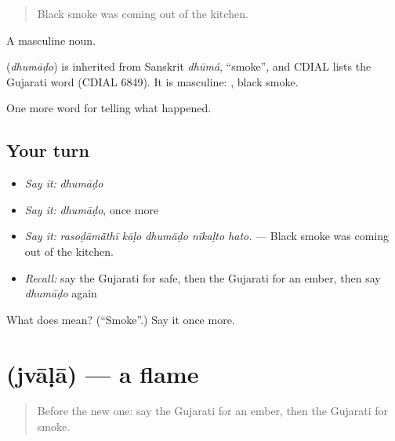 \begin{quote}
Black smoke was coming out of the kitchen.
\end{quote}

A masculine noun.

\begin{cousinweb}
\textbf{} (\emph{dhumāḍo}) is inherited from Sanskrit \emph{dhūmá}, \textquotedblleft{}smoke\textquotedblright{}, and CDIAL lists the Gujarati word (CDIAL 6849). It is masculine: \textbf{ }, black smoke.
\end{cousinweb}

\begin{grammarlens}[title={What you've built}]
One more word for telling what happened.
\end{grammarlens}

\subsection*{Your turn}
\begin{itemize}
\raggedright
  \item \emph{Say it:} \emph{dhumāḍo}
  \item \emph{Say it:} \emph{dhumāḍo}, once more
  \item \emph{Say it:} \emph{rasoḍāmā̃thī kāḷo dhumāḍo nīkaḷto hato.} — Black smoke was coming out of the kitchen.
  \item \emph{Recall:} say the Gujarati for safe, then the Gujarati for an ember, then say \emph{dhumāḍo} again
\end{itemize}

\begin{tcolorbox}[breakable,colback=teal!4,colframe=teal!35!black,title={Before you move on}]
What does  mean? (\textquotedblleft{}Smoke\textquotedblright{}.) Say it once more.
\end{tcolorbox}
\section[\texorpdfstring{\gu{જ્વાળા} (jvāḷā)}{જ્વાળા (jvāḷā)}]{ (jvāḷā) — a flame}

\label{lesson:GU-C300-jvala}



\begin{quote}
Before the new one: say the Gujarati for an ember, then the Gujarati for smoke.
\end{quote}

